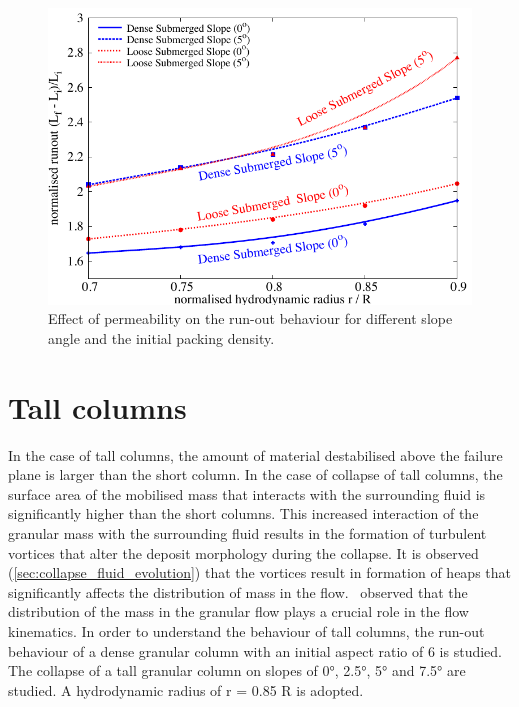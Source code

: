 \begin{figure}
\centering
\includegraphics[width=0.97\columnwidth]{Perm_Runout_slope}
\caption{Effect of permeability on the run-out behaviour for different slope 
angle and the initial packing density.}
\label{fig:Perm_Runout_slope}
\end{figure}

\section{Tall columns}

In the case of tall columns, the amount of material destabilised above the 
failure plane is larger than the short column. In the case of collapse of tall 
columns, the surface area of the mobilised mass that interacts with the 
surrounding fluid is significantly higher than the short columns. This 
increased interaction of the granular mass with the surrounding fluid results 
in the formation of turbulent vortices that alter the deposit morphology during 
the collapse. It is observed (\cref{sec:collapse_fluid_evolution}) that the 
vortices result in formation of heaps that significantly affects the 
distribution of mass in the flow.~\citet{Staron2007a} observed that the 
distribution of the mass in the granular flow plays a crucial role in the flow 
kinematics. In order to understand the behaviour of tall columns, the run-out 
behaviour of a dense granular column with an initial aspect ratio of 6 is 
studied. The collapse of a tall granular column on slopes of 0\si{\degree}, 
2.5\si{\degree}, 5\si{\degree} and 7.5\si{\degree} are studied. A hydrodynamic 
radius of r = 0.85 R is adopted. 

